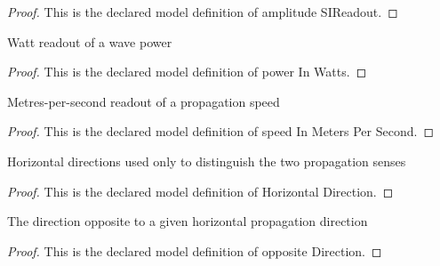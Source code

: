 \begin{proof}
  This is the declared model definition of amplitude SIReadout.
\end{proof}
\begin{definition}
  \label{def:physics:phyx-mini-0307:phyxminiproblems-problemphyxmini0307-powerinwatts}
  Watt readout of a wave power
\end{definition}
\begin{proof}
  This is the declared model definition of power In Watts.
\end{proof}
\begin{definition}
  \label{def:physics:phyx-mini-0307:phyxminiproblems-problemphyxmini0307-speedinmeterspersecond}
  Metres-per-second readout of a propagation speed
\end{definition}
\begin{proof}
  This is the declared model definition of speed In Meters Per Second.
\end{proof}
\begin{definition}
  \label{def:physics:phyx-mini-0307:phyxminiproblems-problemphyxmini0307-horizontaldirection}
  Horizontal directions used only to distinguish the two propagation senses
\end{definition}
\begin{proof}
  This is the declared model definition of Horizontal Direction.
\end{proof}
\begin{definition}
  \label{def:physics:phyx-mini-0307:phyxminiproblems-problemphyxmini0307-oppositedirection}
  The direction opposite to a given horizontal propagation direction
\end{definition}
\begin{proof}
  This is the declared model definition of opposite Direction.
\end{proof}
